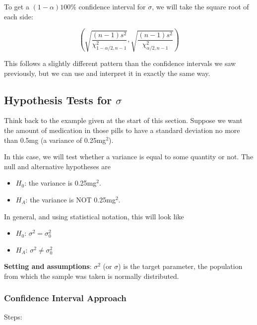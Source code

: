 \documentclass[
]{book}
\providecommand{\tightlist}{%
  \setlength{\itemsep}{0pt}\setlength{\parskip}{0pt}}
\begin{document}
To get a \((1-\alpha)100\%\) confidence interval for \(\sigma\), we will take the square root of each side:

\[\left(\sqrt{\frac{(n-1)s^2}{\chi^2_{1-\alpha/2, n-1}}}, \sqrt{\frac{(n-1)s^2}{\chi^2_{\alpha/2, n-1}}}\right)\]

This follows a slightly different pattern than the confidence intervals we saw previously, but we can use and interpret it in exactly the same way.

\subsection{\texorpdfstring{Hypothesis Tests for \(\sigma\)}{Hypothesis Tests for \textbackslash sigma}}\label{hypothesis-tests-for-sigma}

Think back to the example given at the start of this section. Suppose we want the amount of medication in those pills to have a standard deviation no more than 0.5mg (a variance of 0.25mg\(^2\)).

In this case, we will test whether a variance is equal to some quantity or not. The null and alternative hypotheses are

\begin{itemize}
\tightlist
\item
  \(H_0\): the variance is 0.25mg\(^2\).
\item
  \(H_A\): the variance is NOT 0.25mg\(^2\).
\end{itemize}

In general, and using statistical notation, this will look like

\begin{itemize}
\tightlist
\item
  \(H_0\): \(\sigma^2 = \sigma^2_0\)
\item
  \(H_A\): \(\sigma^2 \ne \sigma^2_0\)
\end{itemize}

\textbf{Setting and assumptions}: \(\sigma^2\) (or \(\sigma\)) is the target parameter, the population from which the sample was taken is normally distributed.

\subsubsection*{Confidence Interval Approach}\label{confidence-interval-approach-1}

Steps:
\end{document}
